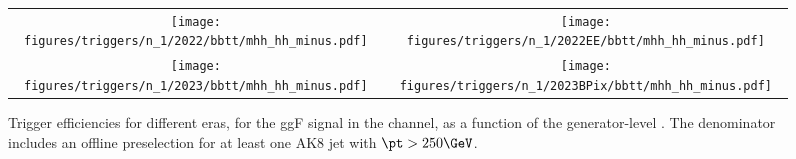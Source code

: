 
    \begin{figure}[H]
        \centering
        \begin{tabular}{cc}
            \texttt{[image: figures/triggers/n\_1/2022/bbtt/mhh\_hh\_minus.pdf]} &
            \texttt{[image: figures/triggers/n\_1/2022EE/bbtt/mhh\_hh\_minus.pdf]} \\[1ex]
            \texttt{[image: figures/triggers/n\_1/2023/bbtt/mhh\_hh\_minus.pdf]} &
            \texttt{[image: figures/triggers/n\_1/2023BPix/bbtt/mhh\_hh\_minus.pdf]}
            \label{fig}
        \end{tabular}
\caption{Trigger efficiencies for different eras, for the ggF \HHbbtt signal in the \tauhh channel, as a function of the generator-level \mHH. The denominator includes an offline preselection for at least one AK8 jet with $\pt > 250\GeV$.}
\label{fig:triggers_n-1_bbtt_hh_mhh}
\end{figure}
